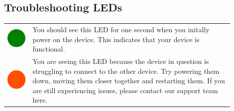 		\subsection{Troubleshooting LEDs}
		\label{subsec:troubleshooting_leds}

			\begin{tabular}{ m{0.1\linewidth} m{0.8\linewidth} } 

				\vspace{2em}
				\includegraphics[width=0.5\linewidth]{graphics/green_circle.png}
				
				& You should see this LED for one second when you initally power on the device. This indicates that your device is functional. \\ 

				\vspace{2em}
				\includegraphics[width=0.5\linewidth]{graphics/orange_circle.png}
				
				&  You are seeing this LED because the device in question is struggling to connect to the other device. Try powering them down, moving them closer together and restarting them. If you are still experiencing issues, please contact our support team here. \\ 


\end{tabular}
